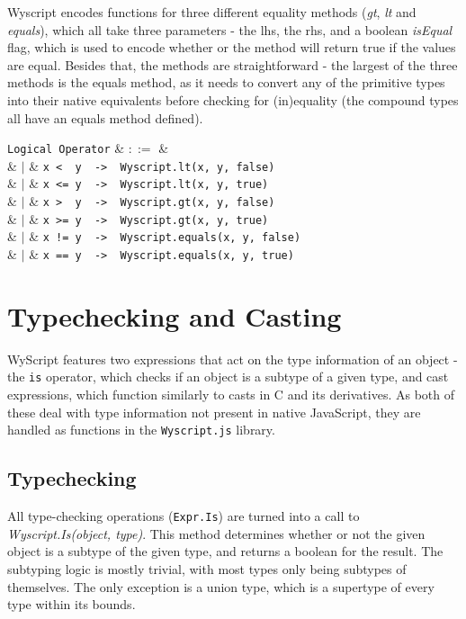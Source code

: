 Wyscript encodes functions for three different equality methods ({\em gt}, {\em lt} and {\em equals}), which all take three parameters - the lhs, the rhs, and a boolean {\em isEqual} flag, which is used to encode whether or the method will return true if the values are equal. Besides that, the methods are straightforward - the largest of the three methods is the equals method, as it needs to convert any of the primitive types into their native equivalents before checking for (in)equality (the compound types all have an equals method defined).

\begin{syntax}
  \verb+Logical Operator+ & $::=$ & \\
  & $|$ & \verb+x <  y  ->  Wyscript.lt(x, y, false)+\\
  & $|$ & \verb+x <= y  ->  Wyscript.lt(x, y, true)+\\
  & $|$ & \verb+x >  y  ->  Wyscript.gt(x, y, false)+\\
  & $|$ & \verb+x >= y  ->  Wyscript.gt(x, y, true)+\\
  & $|$ & \verb+x != y  ->  Wyscript.equals(x, y, false)+\\
  & $|$ & \verb+x == y  ->  Wyscript.equals(x, y, true)+\\
\end{syntax}

\section{Typechecking and Casting}
\label{c_functions_typecasting}

WyScript features two expressions that act on the type information of an object - the \verb+is+ operator, which checks if an object is a subtype of a given type, and cast expressions, which function similarly to casts in C and its derivatives. As both of these deal with type information not present in native JavaScript, they are handled as functions in the \verb+Wyscript.js+ library.

\subsection{Typechecking}
\label{c_functions_typechecking}

All type-checking operations (\lstinline{Expr.Is}) are turned into a call to {\em Wyscript.Is(object, type)}. This method determines whether or not the given object is a subtype of the given type, and returns a boolean for the result. The subtyping logic is mostly trivial, with most types only being subtypes of themselves. The only exception is a union type, which is a supertype of every type within its bounds.

